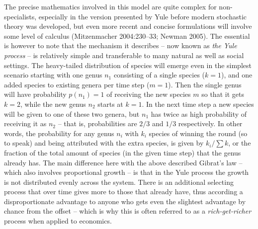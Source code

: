 \documentclass[
  12pt,
]{book}
\begin{document}
The precise mathematics involved in this model are quite complex for non-specialists, especially in the version presented by Yule before modern stochastic theory was developed, but even more recent and concise formulations will involve some level of calculus (Mitzenmacher 2004:230--33; Newman 2005). The essential is however to note that the mechanism it describes -- now known as \emph{the Yule process} -- is relatively simple and transferable to many natural as well as social settings. The heavy-tailed distribution of species will emerge even in the simplest scenario starting with one genus \(n_1\) consisting of a single species (\(k = 1\)), and one added species to existing genera per time step (\(m = 1\)). Then the single genus will have probability \(p(n_1) = 1\) of receiving the new species \(m\) so that it gets \(k = 2\), while the new genus \(n_2\) starts at \(k = 1\). In the next time step a new species will be given to one of these two genera, but \(n_1\) has twice as high probability of receiving it as \(n_2\) -- that is, probabilities are \(2/3\) and \(1/3\) respectively. In other words, the probability for any genus \(n_{i}\) with \(k_i\) species of winning the round (so to speak) and being attributed with the extra species, is given by \(k_i/\sum{k}\), or the fraction of the total amount of species (in the given time step) that the genus already has. The main difference here with the above described Gibrat's law -- which also involves proportional growth -- is that in the Yule process the growth is not distributed evenly across the system. There is an additional selecting process that over time gives more to those that already have, thus according a disproportionate advantage to anyone who gets even the slightest advantage by chance from the offset -- which is why this is often referred to as a \emph{rich-get-richer} process when applied to economics.
\end{document}
